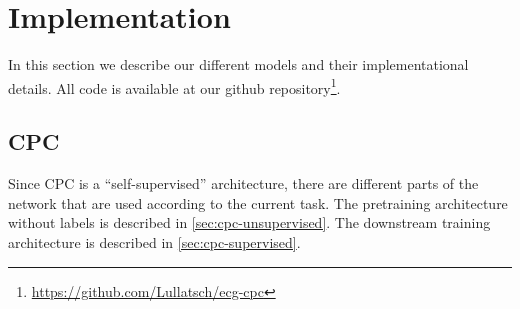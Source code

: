 \section{Implementation}
In this section we describe our different models and their implementational details. All code is available at our github repository\footnote{\url{https://github.com/Lullatsch/ecg-cpc}}.

\subsection{CPC}
Since CPC is a \enquote{self-supervised} architecture, there are different parts of the network that are used according to the current task. The pretraining architecture without labels is described in \autoref{sec:cpc-unsupervised}. The downstream training architecture is described in \autoref{sec:cpc-supervised}.

